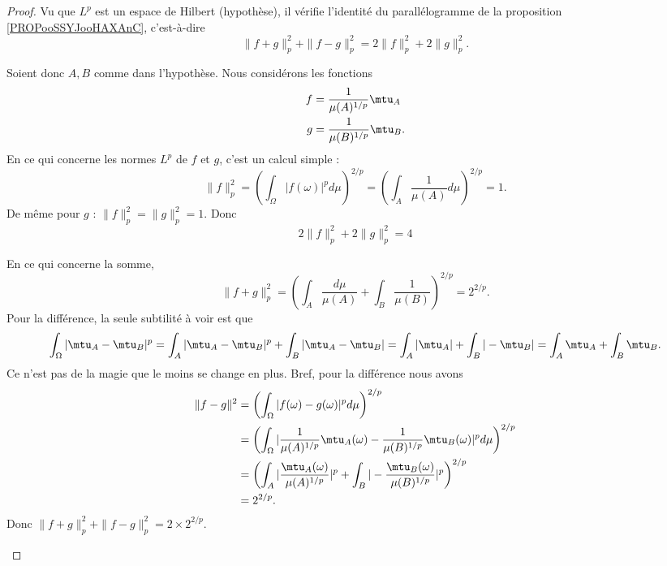 \begin{proof}
	Vu que \( L^p\) est un espace de Hilbert (hypothèse), il vérifie l'identité du parallélogramme de la proposition \ref{PROPooSSYJooHAXAnC}, c'est-à-dire
	\begin{equation}        \label{EQooAKKYooURIbvi}
		\| f+g \|^2_p+\| f-g \|^2_p=2\| f \|_p^2+2\| g \|^2_p.
	\end{equation}

	\begin{subproof}


		Soient donc \( A,B\) comme dans l'hypothèse. Nous considérons les fonctions
		\begin{subequations}
			\begin{align}
				f & =\frac{1}{ \mu(A)^{1/p} }\mtu_A  \\
				g & =\frac{1}{ \mu(B)^{1/p} }\mtu_B.
			\end{align}
		\end{subequations}
		En ce qui concerne les normes \( L^p\) de \( f\) et \( g\), c'est un calcul simple :
		\begin{equation}
			\| f \|_p^2=\left( \int_{\Omega}| f(\omega) |^pd\mu \right)^{2/p}=\left( \int_A\frac{1}{ \mu(A) }d\mu \right)^{2/p}=1.
		\end{equation}
		De même pour \( g\) : \( \| f \|_p^2=\| g \|_p^2=1\). Donc
		\begin{equation}
			2\| f \|_p^2+2\| g \|_p^2=4
		\end{equation}

		En ce qui concerne la somme,
		\begin{equation}
			\| f+g \|_p^2=\left( \int_A\frac{ d\mu }{ \mu(A) }+\int_B\frac{1}{ \mu(B) } \right)^{2/p}=2^{2/p}.
		\end{equation}
		Pour la différence, la seule subtilité à voir est que
		\begin{equation}
			\int_{\Omega}| \mtu_A-\mtu_B |^p=\int_A| \mtu_A-\mtu_B |^p+\int_B| \mtu_A-\mtu_B |=\int_A| \mtu_A |+\int_B| -\mtu_B |=\int_A\mtu_A+\int_B\mtu_B.
		\end{equation}
		Ce n'est pas de la magie que le moins se change en plus. Bref, pour la différence nous avons
		\begin{subequations}
			\begin{align}
				\| f-g \|^2 & =\left( \int_{\Omega}| f(\omega)-g(\omega) |^pd\mu \right)^{2/p}                                                                     \\
				            & =\left( \int_{\Omega}| \frac{1}{ \mu(A)^{1/p} }\mtu_A(\omega)-\frac{1}{ \mu(B)^{1/p} }\mtu_B(\omega) |^pd\mu \right)^{2/p}           \\
				            & =\left( \int_A| \frac{ \mtu_A(\omega) }{ \mu(A)^{1/p} } |^p   +\int_B| -\frac{ \mtu_B(\omega) }{ \mu(B)^{1/p} } |^p    \right)^{2/p} \\
				            & =2^{2/p}.
			\end{align}
		\end{subequations}
		Donc \( \| f+g \|^{2}_p+\| f-g \|_p^2=2\times 2^{2/p}\).


\end{subproof}
\end{proof}
